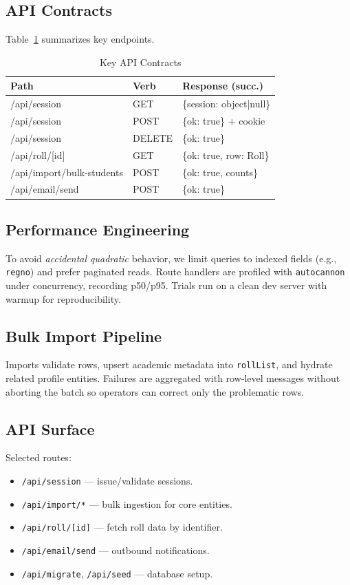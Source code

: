 \documentclass[conference]{IEEEtran}
\begin{document}
\subsection{API Contracts}
Table~\ref{tab:api} summarizes key endpoints.
\begin{table}[t]
\centering
\caption{Key API Contracts}
\label{tab:api}
\begin{tabular}{p{3.2cm}p{1.0cm}p{3.2cm}}
\toprule
\textbf{Path} & \textbf{Verb} & \textbf{Response (succ.)} \\
\midrule
/api/session & GET & \{session: object|null\} \\
/api/session & POST & \{ok: true\} + cookie \\
/api/session & DELETE & \{ok: true\} \\
/api/roll/[id] & GET & \{ok: true, row: Roll\} \\
/api/import/bulk-students & POST & \{ok: true, counts\} \\
/api/email/send & POST & \{ok: true\} \\
\bottomrule
\end{tabular}
\end{table}

\subsection{Performance Engineering}
To avoid \emph{accidental quadratic} behavior, we limit queries to indexed fields (e.g., \texttt{regno}) and prefer paginated reads. Route handlers are profiled with \texttt{autocannon} under concurrency, recording p50/p95. Trials run on a clean dev server with warmup for reproducibility.

\subsection{Bulk Import Pipeline}
Imports validate rows, upsert academic metadata into \texttt{rollList}, and hydrate related profile entities. Failures are aggregated with row‑level messages without aborting the batch so operators can correct only the problematic rows.

\subsection{API Surface}
Selected routes:
\begin{itemize}[leftmargin=*,nosep]
  \item \texttt{/api/session} — issue/validate sessions.
  \item \texttt{/api/import/*} — bulk ingestion for core entities.
  \item \texttt{/api/roll/[id]} — fetch roll data by identifier.
  \item \texttt{/api/email/send} — outbound notifications.
  \item \texttt{/api/migrate}, \texttt{/api/seed} — database setup.
\end{itemize}
\end{document}
